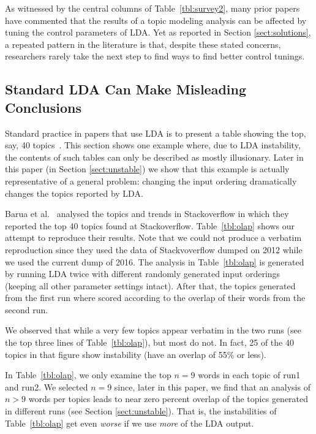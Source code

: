 \documentclass[twocolumn,5p,sort&compress]{elsarticle}
\newcommand{\tion}[1]{\ref{sect:#1}}
\theoremstyle{break}
\begin{document}
As witnessed by the central columns of Table~\ref{tbl:survey2},
many prior papers~\cite{panichella2013effectively,lohar2013improving,sun2015msr4sm} have commented that the results of a topic modeling
analysis can be affected by tuning the control parameters of LDA.
Yet as reported in Section \tion{solutions},
a repeated pattern in the literature is that, despite these
stated concerns, researchers rarely take the next step to find ways to find better control tunings.


\subsection{Standard LDA Can Make Misleading Conclusions}
Standard practice in papers that use LDA is to present a table showing the top, say, 40
topics~\cite{barua2014developers}.
This section shows one example where, due to LDA instability,
the contents of such tables can only be described as  mostly illusionary.
Later in this paper (in Section \tion{unstable}) we show that this example is actually representative of
a general problem: changing the input ordering dramatically changes the topics
reported by LDA.

Barua et al.~\cite{barua2014developers}
analysed the topics and trends in Stackoverflow in which they reported the top 40 topics found at Stackoverflow. Table~\ref{tbl:olap} shows our attempt to reproduce their results.
Note that we could not produce a verbatim reproduction since they used the data of Stackvoverflow dumped on 2012 while we used the current dump of 2016.
The analysis in Table~\ref{tbl:olap} is generated by running LDA twice with different
randomly generated input orderings (keeping all other parameter settings intact). After that, the topics generated from the first run where scored
according to the overlap of their words
from the second run.

We observed that while a very few topics appear verbatim in the two runs (see the top three lines of Table~\ref{tbl:olap}), but
most do not. In fact,
25 of the 40 topics in that figure show  instability (have an overlap of 55\% or less).

In Table~\ref{tbl:olap}, we only
examine the top $n=9$ words in each topic of run1 and run2. We selected \mbox{$n=9$} since,
later in this paper, we find that an analysis of \mbox{$n>9$} words per topics leads to near
 zero percent overlap of the topics generated in different runs (see Section \tion{unstable}).
That is, the instabilities of Table~\ref{tbl:olap} get even {\em worse} if we use {\em more} of the LDA output.
\end{document}
